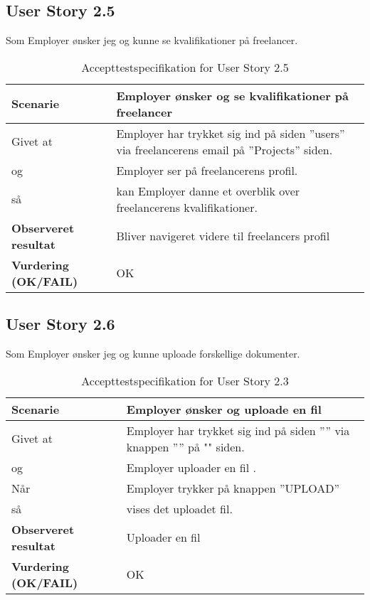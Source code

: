 \subsection{User Story 2.5}
Som Employer ønsker jeg og kunne se kvalifikationer på freelancer.

\begin{table}[H]
	\centering
	\caption{Accepttestspecifikation for User Story 2.5 }
	\begin{tabular}{p{8cm}|p{8cm}}
		\hline
		\textbf{Scenarie} & Employer ønsker og se kvalifikationer på freelancer\\[10px]
		\hline
		Givet at & Employer har trykket sig ind på siden ''users'' via freelancerens email på ''Projects'' siden.\\
        \hline
        og & Employer ser på freelancerens profil.\\
        \hline
        så & kan Employer danne et overblik over freelancerens kvalifikationer.\\
		\hline
		\rowcolor{white}
		\textbf{Observeret resultat} & Bliver navigeret videre til freelancers profil\\
		\hline
		\textbf{Vurdering (OK/FAIL)} & OK\\
		\hline
	\end{tabular}
\end{table}

\subsection{User Story 2.6}
Som Employer ønsker jeg og kunne uploade forskellige dokumenter.

\begin{table}[H]
	\centering
	\caption{Accepttestspecifikation for User Story 2.3 }
	\begin{tabular}{p{6cm}|p{6cm}}
		\hline
		\textbf{Scenarie} & Employer ønsker og uploade en fil\\[10px]
		\hline
		Givet at & Employer har trykket sig ind på siden '''' via knappen '''' på "" siden.\\
        \hline
        og & Employer uploader en fil .\\
        \hline
        Når & Employer trykker på knappen ''UPLOAD''\\
        \hline
        så & vises det uploadet fil.\\
		\hline
		\rowcolor{white}
		\textbf{Observeret resultat} & Uploader en fil\\
		\hline
		\textbf{Vurdering (OK/FAIL)} & OK\\
		\hline
	\end{tabular}
\end{table}


